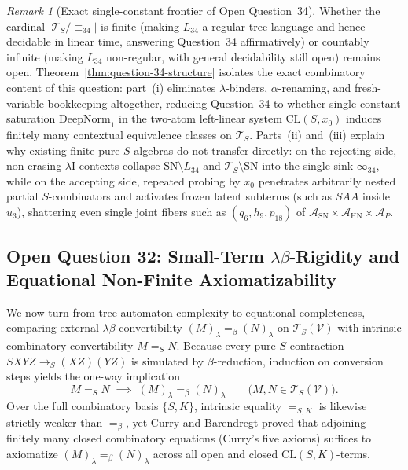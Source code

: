\documentclass[11pt,reqno]{amsart}
\numberwithin{equation}{section}
\theoremstyle{plain}
\theoremstyle{definition}
\theoremstyle{remark}
\newtheorem{remark}[theorem]{Remark}
\newcommand{\TS}{\mathcal{T}_S}
\newcommand{\TSV}{\mathcal{T}_S(\mathcal{V})}
\newcommand{\SN}{\mathrm{SN}}
\newcommand{\HN}{\mathrm{HN}}
\newcommand{\redS}{\to_S}
\newcommand{\convS}{=_S}
\begin{document}
\begin{remark}[Exact single-constant frontier of Open Question~34]\label{rem:question-34-frontier}
Whether the cardinal $|\TS / {\equiv_{34}}|$ is finite (making $L_{34}$ a regular tree language and hence decidable in linear time, answering Question~34 affirmatively) or countably infinite (making $L_{34}$ non-regular, with general decidability still open) remains open. Theorem~\ref{thm:question-34-structure} isolates the exact combinatory content of this question: part~(i) eliminates $\lambda$-binders, $\alpha$-renaming, and fresh-variable bookkeeping altogether, reducing Question~34 to whether single-constant saturation $\mathrm{DeepNorm}_1$ in the two-atom left-linear system $\mathrm{CL}(S, x_0)$ induces finitely many contextual equivalence classes on $\TS$. Parts~(ii) and~(iii) explain why existing finite pure-$S$ algebras do not transfer directly: on the rejecting side, non-erasing $\lambda\mathrm{I}$ contexts collapse $\SN \setminus L_{34}$ and $\TS \setminus \SN$ into the single sink $\infty_{34}$, while on the accepting side, repeated probing by $x_0$ penetrates arbitrarily nested partial $S$-combinators and activates frozen latent subterms (such as $S A A$ inside $u_3$), shattering even single joint fibers such as $(q_6, h_9, p_{18})$ of $\mathcal{A}_{\SN} \times \mathcal{A}_{\HN} \times \mathcal{A}_P$.
\end{remark}

\subsection{Open Question 32: Small-Term \texorpdfstring{$\lambda\beta$}{lambda-beta}-Rigidity and Equational Non-Finite Axiomatizability}\label{subsec:question-32}

We now turn from tree-automaton complexity to equational completeness, comparing external $\lambda\beta$-convertibility $(M)_\lambda =_\beta (N)_\lambda$ on $\TSV$ with intrinsic combinatory convertibility $M \convS N$. Because every pure-$S$ contraction $S X Y Z \redS (X Z)(Y Z)$ is simulated by $\beta$-reduction, induction on conversion steps yields the one-way implication
\begin{equation}\label{eq:convS-implies-convBeta}
  M \convS N \;\implies\; (M)_\lambda =_\beta (N)_\lambda \qquad \bigl(M, N \in \TSV\bigr).
\end{equation}
Over the full combinatory basis $\{S, K\}$, intrinsic equality $=_{S,K}$ is likewise strictly weaker than $=_\beta$, yet Curry \cite{Curry1930,CurryFeys1958} and Barendregt \cite[Theorem~7.3.10]{Barendregt1984} proved that adjoining finitely many closed combinatory equations (Curry's five axioms) suffices to axiomatize $(M)_\lambda =_\beta (N)_\lambda$ across all open and closed $\mathrm{CL}(S, K)$-terms.
\end{document}
